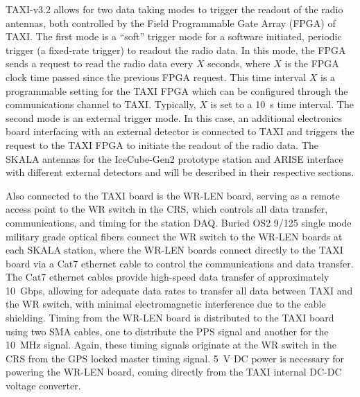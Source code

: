TAXI-v3.2 allows for two data taking modes to trigger the readout of the radio antennas, both controlled by the Field Programmable Gate Array (FPGA) of TAXI.
The first mode is a ``soft'' trigger mode for a software initiated, periodic trigger (a fixed-rate trigger) to readout the radio data.
In this mode, the FPGA sends a request to read the radio data every $X$ seconds, where $X$ is the FPGA clock time passed since the previous FPGA request.
This time interval $X$ is a programmable setting for the TAXI FPGA which can be configured through the communications channel to TAXI.
Typically, $X$ is set to a \qty{10}{\second} time interval.
The second mode is an external trigger mode.
In this case, an additional electronics board interfacing with an external detector is connected to TAXI and triggers the request to the TAXI FPGA to initiate the readout of the radio data.
The SKALA antennas for the IceCube-Gen2 prototype station and ARISE interface with different external detectors and will be described in their respective sections.


Also connected to the TAXI board is the WR-LEN board, serving as a remote access point to the WR switch in the CRS, which controls all data transfer, communications, and timing for the station DAQ.
Buried OS2 9/125 single mode military grade optical fibers connect the WR switch to the WR-LEN boards at each SKALA station, where the WR-LEN boards connect directly to the TAXI board via a Cat7 ethernet cable to control the communications and data transfer.
The Cat7 ethernet cables provide high-speed data transfer of approximately \SI{10}{Gbps}, allowing for adequate data rates to transfer all data between TAXI and the WR switch, with minimal electromagnetic interference due to the cable shielding.
Timing from the WR-LEN board is distributed to the TAXI board using two SMA cables, one to distribute the PPS signal and another for the \SI{10}{\mega\hertz} signal.
Again, these timing signals originate at the WR switch in the CRS from the GPS locked master timing signal.
\SI{5}{\volt} DC power is necessary for powering the WR-LEN board, coming directly from the TAXI internal DC-DC voltage converter.

